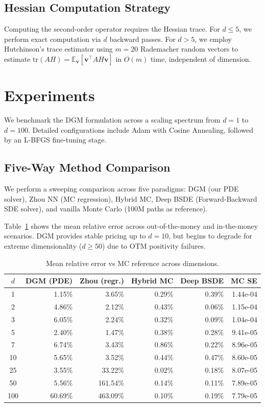 \documentclass{article}
\begin{document}
\subsection{Hessian Computation Strategy}
Computing the second-order operator requires the Hessian trace. For $d \le 5$, we perform exact computation via $d$ backward passes. For $d > 5$, we employ Hutchinson's trace estimator using $m=20$ Rademacher random vectors to estimate $\text{tr}(AH) = \mathbb{E}_{\mathbf{v}}[\mathbf{v}^\top A H \mathbf{v}]$ in $O(m)$ time, independent of dimension.

\section{Experiments}
We benchmark the DGM formulation across a scaling spectrum from $d=1$ to $d=100$. Detailed configurations include Adam with Cosine Annealing, followed by an L-BFGS fine-tuning stage. 

\subsection{Five-Way Method Comparison}
We perform a sweeping comparison across five paradigms: DGM (our PDE solver), Zhou NN \citep{zhou2021} (MC regression), Hybrid MC, Deep BSDE (Forward-Backward SDE solver), and vanilla Monte Carlo (100M paths as reference). 

Table~\ref{tab:comparison} shows the mean relative error across out-of-the-money and in-the-money scenarios. DGM provides stable pricing up to $d=10$, but begins to degrade for extreme dimensionality ($d \ge 50$) due to OTM positivity failures.

\begin{table}[h]
\centering
\caption{Mean relative error vs MC reference across dimensions.}
\label{tab:comparison}
\begin{tabular}{crrrrr}
\toprule
$d$ & \textbf{DGM (PDE)} & \textbf{Zhou (regr.)} & \textbf{Hybrid MC} & \textbf{Deep BSDE} & \textbf{MC SE} \\
\midrule
1   & 1.15\%  & 3.65\%   & 0.29\% & 0.39\% & 1.44e-04 \\
2   & 4.86\%  & 2.12\%   & 0.43\% & 0.06\% & 1.15e-04 \\
3   & 6.05\%  & 2.24\%   & 0.32\% & 0.09\% & 1.04e-04 \\
5   & 2.40\%  & 1.47\%   & 0.38\% & 0.28\% & 9.41e-05 \\
7   & 6.74\%  & 3.43\%   & 0.86\% & 0.22\% & 8.96e-05 \\
10  & 5.65\%  & 3.52\%   & 0.44\% & 0.47\% & 8.60e-05 \\
25  & 3.55\%  & 33.22\%  & 0.02\% & 0.18\% & 8.07e-05 \\
50  & 5.56\%  & 161.54\% & 0.14\% & 0.11\% & 7.89e-05 \\
100 & 60.69\% & 463.09\% & 0.10\% & 0.19\% & 7.79e-05 \\
\bottomrule
\end{tabular}
\end{table}
\end{document}
